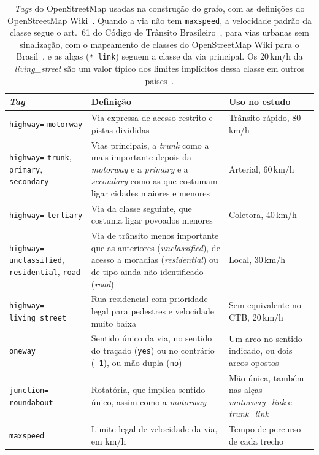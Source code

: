 \begin{table}[tbp]
\centering
\caption{\emph{Tags} do OpenStreetMap usadas na construção do grafo, com as
definições do OpenStreetMap Wiki~\cite{osmwiki}. Quando a via não tem
\texttt{maxspeed}, a velocidade padrão da classe segue o art.~61 do Código de
Trânsito Brasileiro~\cite{ctb1997}, para vias urbanas sem sinalização, com o
mapeamento de classes do OpenStreetMap Wiki para o Brasil~\cite{osmvelocidades},
e as alças (\texttt{*\_link}) seguem a classe da via principal. Os 20\,km/h da
\emph{living\_street} são um valor típico dos limites implícitos dessa classe
em outros países~\cite{osmwiki}.}
\label{tab:tags}
\small
\setlength{\tabcolsep}{3pt}
\renewcommand{\arraystretch}{1.15}
\begin{tabular}{p{2.8cm}p{5.8cm}p{2.8cm}}
\toprule
\emph{Tag} & Definição & Uso no estudo \\
\midrule
\texttt{highway=} \texttt{motorway}
 & Via expressa de acesso restrito e pistas divididas
 & Trânsito rápido, 80\,km/h \\
\texttt{highway=} \texttt{trunk}, \texttt{primary}, \texttt{secondary}
 & Vias principais, a \emph{trunk} como a mais importante depois da
   \emph{motorway} e a \emph{primary} e a \emph{secondary} como as que
   costumam ligar cidades maiores e menores
 & Arterial, 60\,km/h \\
\texttt{highway=} \texttt{tertiary}
 & Via da classe seguinte, que costuma ligar povoados menores
 & Coletora, 40\,km/h \\
\texttt{highway=} \texttt{unclassified}, \texttt{residential}, \texttt{road}
 & Via de trânsito menos importante que as anteriores (\emph{unclassified}),
   de acesso a moradias (\emph{residential}) ou de tipo ainda não
   identificado (\emph{road})
 & Local, 30\,km/h \\
\texttt{highway=} \texttt{living\_street}
 & Rua residencial com prioridade legal para pedestres e velocidade muito baixa
 & Sem equivalente no CTB, 20\,km/h \\
\texttt{oneway}
 & Sentido único da via, no sentido do traçado (\texttt{yes}) ou no contrário
   (\texttt{-1}), ou mão dupla (\texttt{no})
 & Um arco no sentido indicado, ou dois arcos opostos \\
\texttt{junction=} \texttt{roundabout}
 & Rotatória, que implica sentido único, assim como a \emph{motorway}
 & Mão única, também nas alças \emph{motorway\_link} e \emph{trunk\_link} \\
\texttt{maxspeed}
 & Limite legal de velocidade da via, em km/h
 & Tempo de percurso de cada trecho \\
\bottomrule
\end{tabular}
\end{table}

